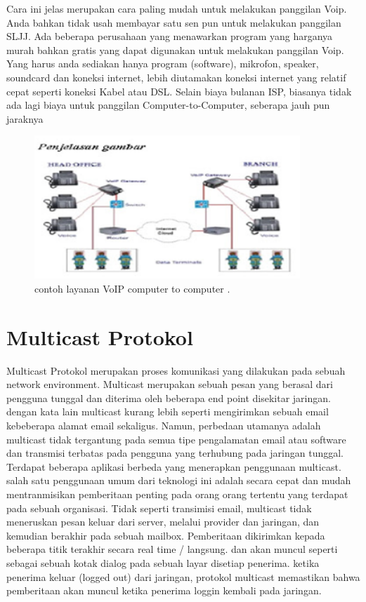 \documentclass{jtetiproposalskripsi}
\begin{document}
\begin{enumerate}[1.]
\begin{singlespace}
Cara ini jelas merupakan cara paling mudah untuk melakukan panggilan Voip. Anda bahkan tidak usah membayar satu sen pun untuk melakukan panggilan SLJJ. Ada beberapa perusahaan yang menawarkan program yang harganya murah bahkan gratis yang dapat digunakan untuk melakukan panggilan Voip. Yang harus anda sediakan hanya program (software), mikrofon, speaker, soundcard dan koneksi internet, lebih diutamakan koneksi internet yang relatif cepat seperti koneksi Kabel atau DSL. Selain biaya bulanan ISP, biasanya tidak ada lagi biaya untuk panggilan Computer-to-Computer, seberapa jauh pun jaraknya
\begin{figure}[ht!]
  \centering
    \includegraphics[width=10cm]{gambar/1}
    \caption{contoh layanan VoIP computer to computer .}
    \label{openwrt}
\end{figure}

\end{singlespace}
\end{enumerate}


\section{Multicast Protokol}
Multicast Protokol merupakan proses komunikasi yang dilakukan pada sebuah network environment. Multicast merupakan sebuah pesan yang berasal dari pengguna tunggal dan diterima oleh beberapa end point disekitar jaringan. dengan kata lain multicast kurang lebih seperti mengirimkan sebuah email kebeberapa alamat email sekaligus. Namun, perbedaan utamanya adalah multicast tidak tergantung pada semua tipe pengalamatan email atau software dan transmisi terbatas pada pengguna yang terhubung pada jaringan tunggal. Terdapat beberapa aplikasi berbeda yang menerapkan penggunaan multicast. salah satu penggunaan umum dari teknologi ini adalah secara cepat dan mudah mentranmisikan pemberitaan penting pada orang orang tertentu yang terdapat pada sebuah organisasi. Tidak seperti transimisi email, multicast tidak meneruskan pesan keluar dari server, melalui provider dan jaringan,  dan kemudian berakhir pada sebuah mailbox. Pemberitaan dikirimkan kepada beberapa titik terakhir secara real time / langsung. dan akan muncul seperti sebagai sebuah kotak dialog pada sebuah layar disetiap penerima. ketika penerima keluar (logged out) dari jaringan, protokol multicast memastikan bahwa pemberitaan akan muncul ketika penerima loggin kembali pada jaringan.
\end{document}
